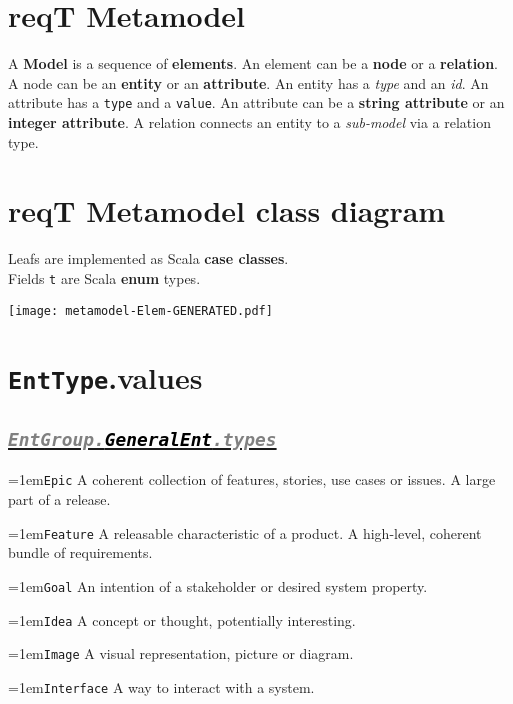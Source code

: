 \documentclass[a4paper,oneside]{article}
\newcommand\Concept[2]{\hangindent=1em\lstinline+#1+ #2}
\begin{document}
\begin{multicols*}{4}
\begin{lstlisting}
\end{lstlisting}


\section*{reqT Metamodel}

A \textbf{Model} is a sequence of \textbf{elements}. 
An element can be a \textbf{node} or a \textbf{relation}. 
A node can be an \textbf{entity} or an \textbf{attribute}. 
An entity has a \textit{type} and an \textit{id}. 
An attribute has a \texttt{type} and a \texttt{value}. 
An attribute can be a \textbf{string attribute} or an \textbf{integer attribute}. 
A relation connects an entity to a \textit{sub-model} via a relation type.


\section*{reqT Metamodel class diagram}
Leafs are implemented as Scala \textbf{case classes}. \\Fields \texttt{t} are Scala \textbf{enum} types.

\noindent\hspace*{-3.1em}\vspace{-3em}\texttt{[image: metamodel-Elem-GENERATED.pdf]}

\section*{\texttt{EntType}.values}
\subsection*{\underline{\texttt{\textit{{\textcolor{gray}{EntGroup.}\textcolor{black}{GeneralEnt}}\textcolor{gray}{.types}}}}}
\Concept{Epic}{A coherent collection of features, stories, use cases or issues. A large part of a release.}

\Concept{Feature}{A releasable characteristic of a product. A high-level, coherent bundle of requirements.}

\Concept{Goal}{An intention of a stakeholder or desired system property.}

\Concept{Idea}{A concept or thought, potentially interesting.}

\Concept{Image}{A visual representation, picture or diagram.}

\Concept{Interface}{A way to interact with a system.}


\end{multicols*}
\end{document}
